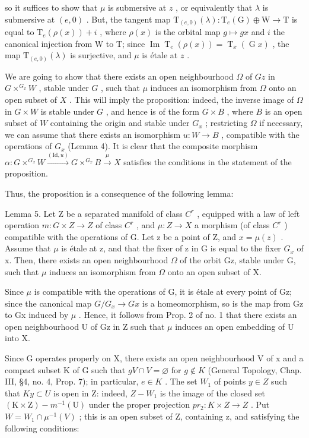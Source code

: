 so it suffices to show that \(\mu\) is submersive at \(z\) , or equivalently that \(\lambda\) is submersive at \((e,0)\) . But, the tangent map \(\mathrm{T}_{(e,0)}(\lambda):\mathrm{T}_e(\mathrm{G})\oplus \mathrm{W}\to \mathrm{T}\) is equal to \(\mathrm{T}_e(\rho (x)) + i\) , where \(\rho (x)\) is the orbital map \(g\mapsto gx\) and \(i\) the canonical injection from W to T; since \(\operatorname {Im}\operatorname {T}_e(\rho (x)) = \operatorname {T}_x(\operatorname {G}x)\) , the map \(\mathrm{T}_{(e,0)}(\lambda)\) is surjective, and \(\mu\) is étale at \(z\) .

We are going to show that there exists an open neighbourhood \(\Omega\) of \(Gz\) in \(G \times ^{G_x}W\) , stable under \(G\) , such that \(\mu\) induces an isomorphism from \(\Omega\) onto an open subset of \(X\) . This will imply the proposition: indeed, the inverse image of \(\Omega\) in \(G \times W\) is stable under \(G\) , and hence is of the form \(G \times B\) , where \(B\) is an open subset of \(W\) containing the origin and stable under \(G_x\) ; restricting \(\Omega\) if necessary, we can assume that there exists an isomorphism \(u: W \to B\) , compatible with the operations of \(G_x\) (Lemma 4). It is clear that the composite morphism \(\alpha: G \times ^{G_x}W \xrightarrow{(\text{Id}, u)} G \times ^{G_x}B \xrightarrow{\mu} X\) satisfies the conditions in the statement of the proposition.

Thus, the proposition is a consequence of the following lemma:

Lemma 5. Let Z be a separated manifold of class \(C^{r}\) , equipped with a law of left operation \(m: G \times Z \to Z\) of class \(C^{r}\) , and \(\mu: Z \to X\) a morphism (of class \(C^{r}\) ) compatible with the operations of G. Let z be a point of Z, and \(x = \mu(z)\) . Assume that \(\mu\) is étale at z, and that the fixer of z in G is equal to the fixer \(G_{x}\) of x. Then, there exists an open neighbourhood \(\Omega\) of the orbit Gz, stable under G, such that \(\mu\) induces an isomorphism from \(\Omega\) onto an open subset of X.

Since \(\mu\) is compatible with the operations of G, it is étale at every point of Gz; since the canonical map \(G/G_{x} \rightarrow Gx\) is a homeomorphism, so is the map from Gz to Gx induced by \(\mu\) . Hence, it follows from Prop. 2 of no. 1 that there exists an open neighbourhood U of Gz in Z such that \(\mu\) induces an open embedding of U into X.

Since G operates properly on X, there exists an open neighbourhood V of x and a compact subset K of G such that \(gV \cap V = \varnothing\) for \(g \notin K\) (General Topology, Chap. III, §4, no. 4, Prop. 7); in particular, \(e \in K\) . The set \(W_{1}\) of points \(y \in Z\) such that \(Ky \subset U\) is open in Z: indeed, \(Z - W_{1}\) is the image of the closed set \((\mathrm{K} \times \mathrm{Z}) - m^{-1}(\mathrm{U})\) under the proper projection \(pr_{2}: K \times Z \to Z\) . Put \(W = W_{1} \cap \mu^{-1}(V)\) ; this is an open subset of Z, containing z, and satisfying the following conditions:

